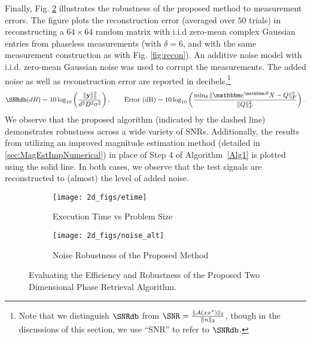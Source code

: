 Finally, Fig. \ref{fig:noise} illustrates the robustness of the proposed method to measurement errors.  The figure plots the reconstruction error (averaged over $50$ trials) in reconstructing a $64\times 64$ random matrix with i.i.d zero-mean complex Gaussian entries from phaseless measurements (with $\delta=6$, and with the same measurement construction as with Fig. \ref{fig:recon}). An additive noise model with i.i.d. zero-mean Gaussian noise was used to corrupt the measurements. The added noise as well as reconstruction error are reported in decibels,\footnote{Note that we distinguish $\SNRdb$ from $\SNR = \frac{\norm{\Ac(x x^*)}_2}{\norm{n}_2}$, though in the discussions of this section, we use ``SNR'' to refer to $\SNRdb$.}
%
\[  \SNRdb (dB) = 10 \log_{10}\left( \frac{\Vert \y \Vert_2^2}{d^2 D^2\sigma^2}\right), \qquad 
    \text{Error (dB)} = 10 \log_{10} \left( \frac{\min_\theta\Vert \mathbbm 
                e^{\mathbbm i \theta}X-Q\Vert^2_F}{\Vert Q\Vert^2_F}\right). \]
%
We observe that the proposed algorithm (indicated by the dashed line) demonstrates robustness across a wide variety of SNRs. Additionally, the results from utilizing an improved magnitude estimation method (detailed in \cref{sec:MagEstImpNumerical}) in place of Step 4 of Algorithm~\ref{Alg1} is plotted using the solid line. In both cases, we observe that the test signals are reconstructed to (almost) the level of added noise. 
%
\begin{figure}[hbtp]
    \centering
    \begin{subfigure}{0.495\textwidth}
        \centering
        \texttt{[image: 2d\_figs/etime]}
        \caption{Execution Time vs Problem Size}
        \label{fig:etime}
    \end{subfigure}
    \hfill
    \begin{subfigure}{0.495\textwidth}
        \centering
        \texttt{[image: 2d\_figs/noise\_alt]}
        \caption{Noise Robustness of the Proposed Method}
        \label{fig:noise}
    \end{subfigure} 
    \vspace{0.05in}
    \caption{Evaluating the Efficiency and Robustness of the Proposed Two Dimensional Phase
    Retrieval Algorithm.}
    \label{fig:perf}
\end{figure}
%
